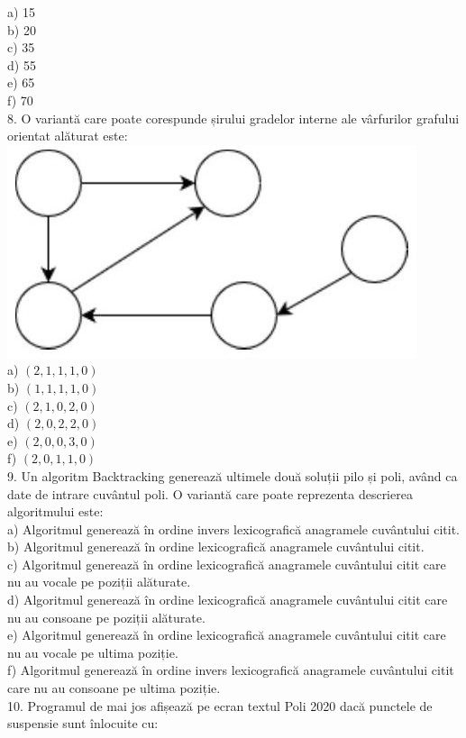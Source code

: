 \documentclass[10pt]{article}
\begin{document}
a) 15\\
b) 20\\
c) 35\\
d) 55\\
e) 65\\
f) 70\\
8. O variantă care poate corespunde șirului gradelor interne ale vârfurilor grafului orientat alăturat este:\\
\includegraphics[max width=\textwidth, center]{2025_04_17_46e04c6acd873ea9558dg-156(1)}\\
a) $(2,1,1,1,0)$\\
b) $(1,1,1,1,0)$\\
c) $(2,1,0,2,0)$\\
d) $(2,0,2,2,0)$\\
e) $(2,0,0,3,0)$\\
f) $(2,0,1,1,0)$\\
9. Un algoritm Backtracking generează ultimele două soluții pilo și poli, având ca date de intrare cuvântul poli. O variantă care poate reprezenta descrierea algoritmului este:\\
a) Algoritmul generează în ordine invers lexicografică anagramele cuvântului citit.\\
b) Algoritmul generează în ordine lexicografică anagramele cuvântului citit.\\
c) Algoritmul generează în ordine lexicografică anagramele cuvântului citit care nu au vocale pe poziții alăturate.\\
d) Algoritmul generează în ordine lexicografică anagramele cuvântului citit care nu au consoane pe poziții alăturate.\\
e) Algoritmul generează în ordine lexicografică anagramele cuvântului citit care nu au vocale pe ultima poziție.\\
f) Algoritmul generează în ordine invers lexicografică anagramele cuvântului citit care nu au consoane pe ultima poziție.\\
10. Programul de mai jos afișează pe ecran textul Poli 2020 dacă punctele de suspensie sunt înlocuite cu:
\end{document}

